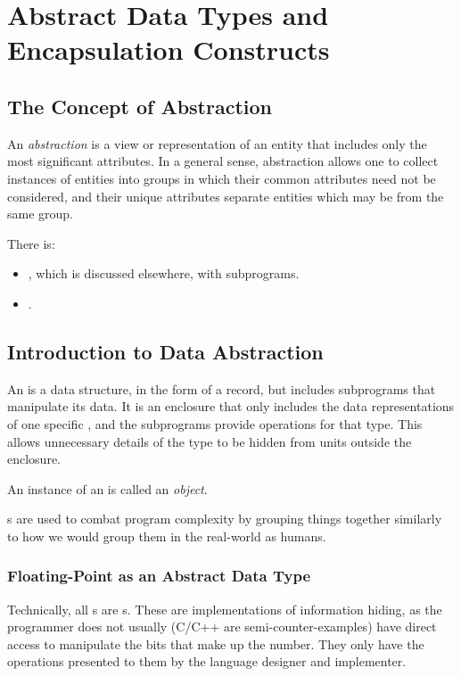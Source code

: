 \section{Abstract Data Types and Encapsulation Constructs}\label{sec:Abstract_Data_Types_Encapsulation_Constructs}
\subsection{The Concept of Abstraction}\label{subsec:Concept_Abstraction}
\begin{definition}[Abstraction]\label{def:Abstraction}
  An \emph{abstraction} is a view or representation of an entity that includes only the most significant attributes.
  In a general sense, abstraction allows one to collect instances of entities into groups in which their common attributes need not be considered, and their unique attributes separate entities which may be from the same group.

  There is:
  \begin{itemize}[noitemsep]
  \item {}, which is discussed elsewhere, with subprograms.
  \item {}.
  \end{itemize}
\end{definition}

\subsection{Introduction to Data Abstraction}\label{subsec:Intro_Data_Abstraction}
An \emph{} is a data structure, in the form of a record, but includes subprograms that manipulate its data.
It is an enclosure that only includes the data representations of one specific , and the subprograms provide operations for that type.
This allows unnecessary details of the type to be hidden from units outside the enclosure.

\begin{definition}[Object]\label{def:Object}
  An instance of an  is called an \emph{object}.
\end{definition}

s are used to combat program complexity by grouping things together similarly to how we would group them in the real-world as humans.

\subsubsection{Floating-Point as an Abstract Data Type}\label{subsubsec:Floating_Point_Abstract_Data_Type}
Technically, all s are s.
These are implementations of information hiding, as the programmer does not usually (C/C++ are semi-counter-examples) have direct access to manipulate the bits that make up the number.
They only have the operations presented to them by the language designer and implementer.

